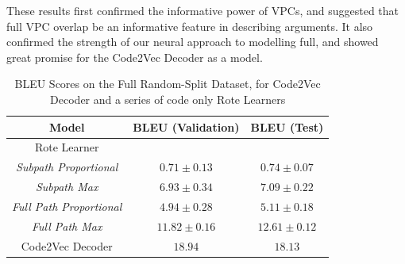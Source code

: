 These results first confirmed the informative power of VPCs, and suggested that full VPC overlap be an informative feature in describing arguments. It also confirmed the strength of our neural approach to modelling full, and showed great promise for the Code2Vec Decoder as a model.


\begin{table}[ht!]
\begin{center}
\begin{tabular}{ c | c | c  }
    Model                             & BLEU (Validation)  & BLEU (Test)      \\
    \hline
    Rote Learner                  &  &  \\
    \textit{Subpath Proportional}              & $ 0.71 \pm  0.13 $ & $ 0.74 \pm 0.07 $   \\
    \textit{Subpath Max}                       & $ 6.93 \pm  0.34 $ & $ 7.09 \pm 0.22 $  \\
    \textit{Full Path Proportional}            & $ 4.94 \pm  0.28 $ & $ 5.11 \pm 0.18 $  \\
    \textit{Full Path Max}                     & $ 11.82 \pm  0.16 $ & $ 12.61 \pm 0.12 $  \\
    \hline
    Code2Vec Decoder                             & $ 18.94 $ & $ 18.13 $  \\
    \hline 
\end{tabular}
\caption {BLEU Scores on the Full Random-Split Dataset, for Code2Vec Decoder and a series of code only Rote Learners}
\label{table:name_code2vec_solo}
\end{center}
\end{table}


